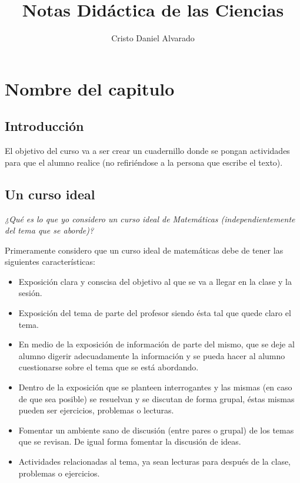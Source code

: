 \documentclass[12pt]{report}
\theoremstyle{largebreak}
\begin{document}
    \setlength{\parskip}{5pt} %
    \setlength{\parindent}{12pt} %
    \title{Notas Didáctica de las Ciencias}
    \author{Cristo Daniel Alvarado}
    \maketitle

    \tableofcontents %

    
    \chapter{Nombre del capitulo}
    
    \section*{Introducción}

    El objetivo del curso va a ser crear un cuadernillo donde se pongan actividades para que el alumno realice (no refiriéndose a la persona que escribe el texto).


    \section{Un curso ideal}

    \textit{¿Qué es lo que yo considero un curso ideal de Matemáticas (independientemente del tema que se aborde)?}
    
    Primeramente considero que un curso ideal de matemáticas debe de tener las siguientes características:

    \begin{itemize}
        \item Exposición clara y conscisa del objetivo al que se va a llegar en la clase y la sesión.
        \item Exposición del tema de parte del profesor siendo ésta tal que quede claro el tema.
        \item En medio de la exposición de información de parte del mismo, que se deje al alumno digerir adecuadamente la información y se pueda hacer al alumno cuestionarse sobre el tema que se está abordando.
        \item Dentro de la exposición que se planteen interrogantes y las mismas (en caso de que sea posible) se resuelvan y se discutan de forma grupal, éstas mismas pueden ser ejercicios, problemas o lecturas.
        \item Fomentar un ambiente sano de discusión (entre pares o grupal) de los temas que se revisan. De igual forma fomentar la discusión de ideas.
        \item Actividades relacionadas al tema, ya sean lecturas para después de la clase, problemas o ejercicios.
    \end{itemize}
\end{document}
